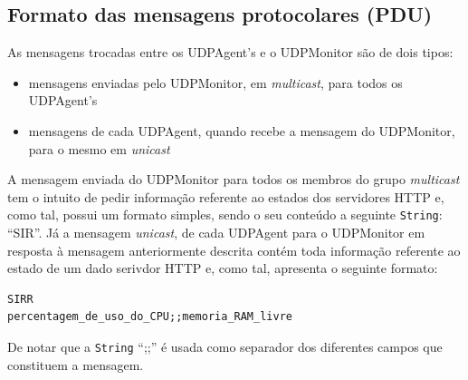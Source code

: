 \documentclass{article}
\begin{document}
\subsection{Formato das mensagens protocolares (PDU)}
As mensagens trocadas entre os UDPAgent's e o UDPMonitor são de dois tipos: 
\begin{itemize}
    \item mensagens enviadas pelo UDPMonitor, em \textit{multicast}, para todos os UDPAgent's
    \item mensagens de cada UDPAgent, quando recebe a mensagem do UDPMonitor, para o mesmo em \textit{unicast}
\end{itemize}

A mensagem enviada do UDPMonitor para todos os membros do grupo \textit{multicast} tem o intuito de pedir informação referente ao estados dos servidores HTTP e, como tal, possui um formato simples, sendo o seu conteúdo a seguinte \texttt{String}: ``SIR''.
Já a mensagem \textit{unicast}, de cada UDPAgent para o UDPMonitor em resposta à mensagem anteriormente descrita contém toda informação referente ao estado de um dado serivdor HTTP e, como tal, apresenta o seguinte formato:
\begin{verbatim}
SIRR
percentagem_de_uso_do_CPU;;memoria_RAM_livre
\end{verbatim}
De notar que a \texttt{String} ``;;'' é usada como separador dos diferentes campos que constituem a mensagem. 
\end{document}
